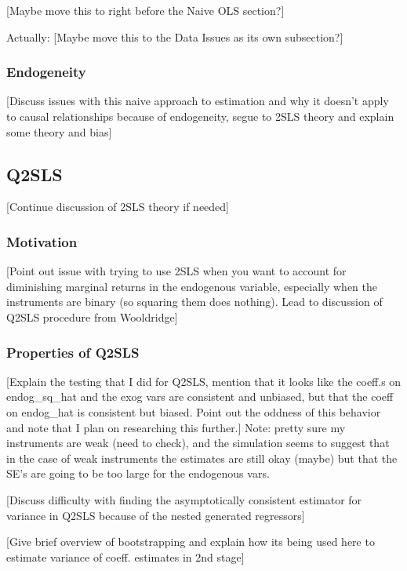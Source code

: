 \documentclass[12pt]{article}
\begin{document}
\textcolor{BrickRed}{[Maybe move this to right before the Naive OLS section?]}

Actually: \textcolor{BrickRed}{[Maybe move this to the Data Issues as its own subsection?]}

\subsubsection{Endogeneity}
\textcolor{BrickRed}{[Discuss issues with this naive approach to estimation and why it doesn't apply to causal relationships because of endogeneity, segue to 2SLS theory and explain some theory and bias]}

\subsection{Q2SLS}
\textcolor{BrickRed}{[Continue discussion of 2SLS theory if needed]}

\subsubsection{Motivation}
\textcolor{BrickRed}{[Point out issue with trying to use 2SLS when you want to account for diminishing marginal returns in the endogenous variable, especially when the instruments are binary (so squaring them does nothing). Lead to discussion of Q2SLS procedure from Wooldridge]}

\subsubsection{Properties of Q2SLS}
\textcolor{BrickRed}{[Explain the testing that I did for Q2SLS, mention that it looks like the coeff.s on endog\_sq\_hat and the exog vars are consistent and unbiased, but that the coeff on endog\_hat is consistent but biased. Point out the oddness of this behavior and note that I plan on researching this further.]} Note: pretty sure my instruments are weak (need to check), and the simulation seems to suggest that in the case of weak instruments the estimates are still okay (maybe) but that the SE's are going to be too large for the endogenous vars.

\textcolor{BrickRed}{[Discuss difficulty with finding the asymptotically consistent estimator for variance in Q2SLS because of the nested generated regressors]}

\textcolor{BrickRed}{[Give brief overview of bootstrapping and explain how its being used here to estimate variance of coeff. estimates in 2nd stage]}
\end{document}
